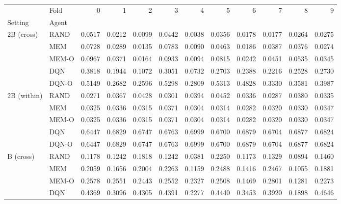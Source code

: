 \documentclass{article}
\newcommand{\tablestyle}[2]{\setlength{\tabcolsep}{#1}\renewcommand{\arraystretch}{#2}\centering\footnotesize}
\begin{document}
\begin{table*}[!h]\centering
  \tablestyle{4pt}{1.2}\begin{tabular}{llrrrrrrrrrr}
\toprule
           & Fold &       0 &       1 &       2 &       3 &       4 &       5 &       6 &       7 &       8 &       9 \\
Setting & Agent &         &         &         &         &         &         &         &         &         &         \\
\midrule
2B (cross) & RAND &  0.0517 &  0.0212 &  0.0099 &  0.0442 &  0.0038 &  0.0356 &  0.0178 &  0.0177 &  0.0264 &  0.0275 \\
           & MEM &  0.0728 &  0.0289 &  0.0135 &  0.0783 &  0.0090 &  0.0463 &  0.0186 &  0.0387 &  0.0376 &  0.0274 \\
           & MEM-O &  0.0967 &  0.0371 &  0.0164 &  0.0933 &  0.0094 &  0.0815 &  0.0242 &  0.0451 &  0.0535 &  0.0345 \\
           & DQN &  0.3818 &  0.1944 &  0.1072 &  0.3051 &  0.0732 &  0.2703 &  0.2388 &  0.2216 &  0.2528 &  0.2730 \\
           & DQN-O &  0.5149 &  0.2682 &  0.2596 &  0.5298 &  0.2809 &  0.5313 &  0.4828 &  0.3330 &  0.3581 &  0.3987 \\
2B (within) & RAND &  0.0271 &  0.0367 &  0.0428 &  0.0301 &  0.0394 &  0.0452 &  0.0336 &  0.0287 &  0.0380 &  0.0335 \\
           & MEM &  0.0325 &  0.0336 &  0.0315 &  0.0371 &  0.0304 &  0.0314 &  0.0282 &  0.0320 &  0.0330 &  0.0347 \\
           & MEM-O &  0.0325 &  0.0336 &  0.0315 &  0.0371 &  0.0304 &  0.0314 &  0.0282 &  0.0320 &  0.0330 &  0.0347 \\
           & DQN &  0.6447 &  0.6829 &  0.6747 &  0.6763 &  0.6999 &  0.6700 &  0.6879 &  0.6704 &  0.6877 &  0.6824 \\
           & DQN-O &  0.6447 &  0.6829 &  0.6747 &  0.6763 &  0.6999 &  0.6700 &  0.6879 &  0.6704 &  0.6877 &  0.6824 \\
B (cross) & RAND &  0.1178 &  0.1242 &  0.1818 &  0.1242 &  0.0381 &  0.2250 &  0.1173 &  0.1329 &  0.0894 &  0.1460 \\
           & MEM &  0.2059 &  0.1656 &  0.2004 &  0.2263 &  0.1159 &  0.2488 &  0.1416 &  0.2467 &  0.1055 &  0.1881 \\
           & MEM-O &  0.2578 &  0.2551 &  0.2443 &  0.2552 &  0.2327 &  0.2508 &  0.1469 &  0.2801 &  0.1281 &  0.2273 \\
           & DQN &  0.4369 &  0.3096 &  0.4305 &  0.4391 &  0.2277 &  0.4440 &  0.3453 &  0.3920 &  0.1898 &  0.4646 \\

\end{tabular}
\end{table*}
\end{document}
